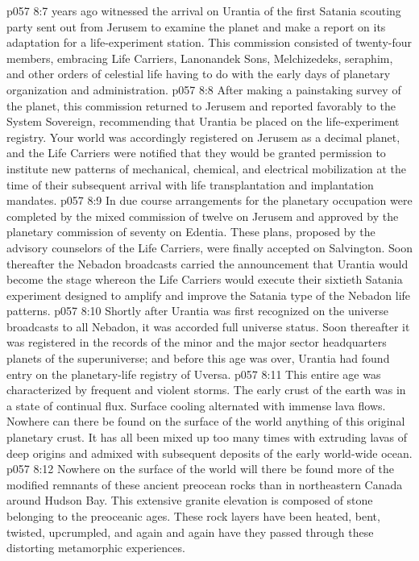 \pc \vs p057 8:7  years ago witnessed the arrival on Urantia of the first Satania scouting party sent out from Jerusem to examine the planet and make a report on its adaptation for a life\hyp{}experiment station. This commission consisted of twenty\hyp{}four members, embracing Life Carriers, Lanonandek Sons, Melchizedeks, seraphim, and other orders of celestial life having to do with the early days of planetary organization and administration.
\vs p057 8:8 After making a painstaking survey of the planet, this commission returned to Jerusem and reported favorably to the System Sovereign, recommending that Urantia be placed on the life\hyp{}experiment registry. Your world was accordingly registered on Jerusem as a decimal planet, and the Life Carriers were notified that they would be granted permission to institute new patterns of mechanical, chemical, and electrical mobilization at the time of their subsequent arrival with life transplantation and implantation mandates.
\vs p057 8:9 In due course arrangements for the planetary occupation were completed by the mixed commission of twelve on Jerusem and approved by the planetary commission of seventy on Edentia. These plans, proposed by the advisory counselors of the Life Carriers, were finally accepted on Salvington. Soon thereafter the Nebadon broadcasts carried the announcement that Urantia would become the stage whereon the Life Carriers would execute their sixtieth Satania experiment designed to amplify and improve the Satania type of the Nebadon life patterns.
\vs p057 8:10 Shortly after Urantia was first recognized on the universe broadcasts to all Nebadon, it was accorded full universe status. Soon thereafter it was registered in the records of the minor and the major sector headquarters planets of the superuniverse; and before this age was over, Urantia had found entry on the planetary\hyp{}life registry of Uversa.
\pc \vs p057 8:11 This entire age was characterized by frequent and violent storms. The early crust of the earth was in a state of continual flux. Surface cooling alternated with immense lava flows. Nowhere can there be found on the surface of the world anything of this original planetary crust. It has all been mixed up too many times with extruding lavas of deep origins and admixed with subsequent deposits of the early world\hyp{}wide ocean.
\vs p057 8:12 Nowhere on the surface of the world will there be found more of the modified remnants of these ancient preocean rocks than in northeastern Canada around Hudson Bay. This extensive granite elevation is composed of stone belonging to the preoceanic ages. These rock layers have been heated, bent, twisted, upcrumpled, and again and again have they passed through these distorting metamorphic experiences.
